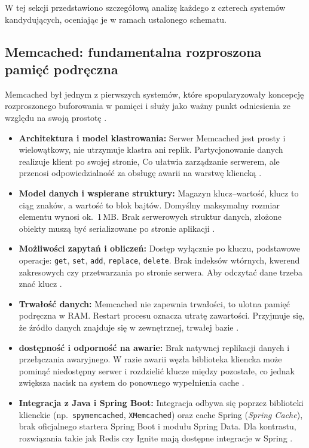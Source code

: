 W tej sekcji przedstawiono szczegółową analizę każdego z czterech systemów kandydujących, oceniając je w ramach ustalonego schematu.

\subsection{Memcached: fundamentalna rozproszona pamięć podręczna}

Memcached był jednym z pierwszych systemów, które spopularyzowały koncepcję rozproszonego buforowania w pamięci i służy jako ważny punkt odniesienia ze względu na swoją prostotę \cite{memcached-docs}.

\begin{itemize}
  \item \textbf{Architektura i model klastrowania:}
        Serwer Memcached jest prosty i wielowątkowy, nie utrzymuje klastra ani replik.
        Partycjonowanie danych realizuje klient po swojej stronie,
        Co ułatwia zarządzanie serwerem, ale przenosi odpowiedzialność za obsługę awarii na warstwę kliencką \cite{memcached-docs}.

  \item \textbf{Model danych i wspierane struktury:}
        Magazyn klucz–wartość, klucz to ciąg znaków, a wartość to  blok bajtów. Domyślny maksymalny rozmiar elementu wynosi ok.\ 1\,MB.
        Brak serwerowych struktur danych, złożone obiekty muszą być serializowane po stronie aplikacji \cite{memcached-docs}.

  \item \textbf{Możliwości zapytań i obliczeń:}
        Dostęp wyłącznie po kluczu, podstawowe operacje: \texttt{get}, \texttt{set}, \texttt{add}, \texttt{replace}, \texttt{delete}.
        Brak indeksów wtórnych, kwerend zakresowych czy przetwarzania po stronie serwera. Aby odczytać dane
        trzeba znać klucz \cite{memcached-docs}.

  \item \textbf{Trwałość danych:}
        Memcached nie zapewnia trwałości, to ulotna pamięć podręczna w RAM.
        Restart procesu oznacza utratę zawartości. Przyjmuje się, że źródło danych
        znajduje się w zewnętrznej, trwałej bazie \cite{memcached-docs}.

  \item \textbf{dostępność i odporność na awarie:}
        Brak natywnej replikacji danych i przełączania awaryjnego. W razie awarii węzła biblioteka kliencka
        może pominąć niedostępny serwer i rozdzielić klucze między pozostałe, co jednak zwiększa
        nacisk na system do ponownego wypełnienia cache \cite{memcached-docs}.

  \item \textbf{Integracja z Java i Spring Boot:}
        Integracja odbywa się poprzez biblioteki klienckie (np.\ \texttt{spymemcached}, \texttt{XMemcached})
        oraz cache Spring (\emph{Spring Cache}), brak oficjalnego startera Spring Boot i modułu Spring Data.
        Dla kontrastu, rozwiązania takie jak Redis czy Ignite mają dostępne integracje w Spring \cite{spring-docs}.
\end{itemize}

